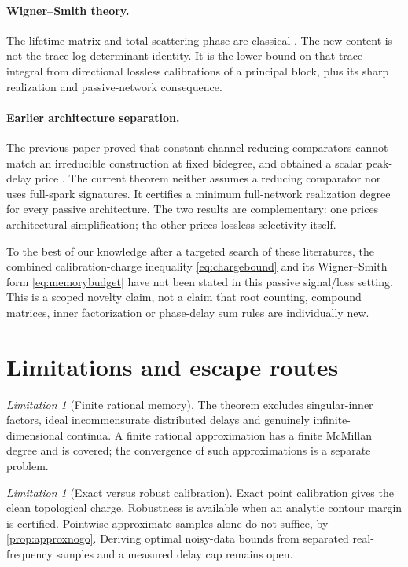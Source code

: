 \documentclass[11pt]{article}
\theoremstyle{definition}
\theoremstyle{remark}
\newtheorem{limitation}[theorem]{Limitation}
\begin{document}
\paragraph{Wigner--Smith theory.}
The lifetime matrix and total scattering phase are classical
\cite{Wigner1955,Smith1960}.  The new content is not the trace-log-determinant
identity.  It is the lower bound on that trace integral from directional
lossless calibrations of a principal block, plus its sharp realization and
passive-network consequence.

\paragraph{Earlier architecture separation.}
The previous paper proved that constant-channel reducing comparators cannot
match an irreducible construction at fixed bidegree, and obtained a scalar
peak-delay price \cite{ErikssonReservoir2026}.  The current theorem neither
assumes a reducing comparator nor uses full-spark signatures.  It certifies a
minimum full-network realization degree for every passive architecture.  The
two results are complementary: one prices architectural simplification; the
other prices lossless selectivity itself.

To the best of our knowledge after a targeted search of these literatures,
the combined calibration-charge inequality \eqref{eq:chargebound} and its
Wigner--Smith form \eqref{eq:memorybudget} have not been stated in this
passive signal/loss setting.  This is a scoped novelty claim, not a claim that
root counting, compound matrices, inner factorization or phase-delay sum
rules are individually new.

\section{Limitations and escape routes}

\begin{limitation}[Finite rational memory]
The theorem excludes singular-inner factors, ideal incommensurate distributed
delays and genuinely infinite-dimensional continua.  A finite rational
approximation has a finite McMillan degree and is covered; the convergence of
such approximations is a separate problem.
\end{limitation}

\begin{limitation}[Exact versus robust calibration]
Exact point calibration gives the clean topological charge.  Robustness is
available when an analytic contour margin is certified.  Pointwise
approximate samples alone do not suffice, by \cref{prop:approxnogo}.
Deriving optimal noisy-data bounds from separated real-frequency samples and
a measured delay cap remains open.
\end{limitation}
\end{document}

